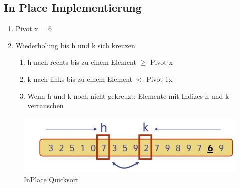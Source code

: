 \subsection{In Place Implementierung}
\begin{enumerate}
	\item Pivot x = 6
	\item Wiederholung bis h und k sich kreuzen
	\begin{enumerate}
		\item h nach rechts bis zu einem Element $\geq$ Pivot x
		\item k nach links bis zu einem Element $<$ Pivot 1x
		\item Wenn h und k noch nicht gekreuzt: Elemente mit Indizes h und k vertauschen
	\end{enumerate}
\end{enumerate}
\begin{figure}[h]
\centering
\includegraphics[width=0.35\linewidth]{images/quicksort_inplace}
\caption{InPlace Quicksort}
\label{fig:quicksortinplace}
\end{figure}

\newpage



